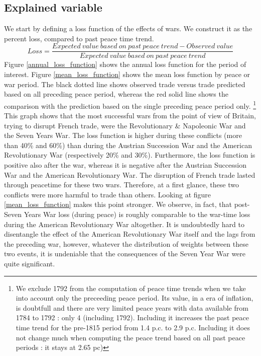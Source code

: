 \documentclass[12pt,a4paper,notitlepage,english]{article}
\begin{document}
\subsection{Explained variable}
We start by defining a loss function of the effects of wars.
We construct it as the percent loss, compared to past peace time trend.
\begin{equation*}
Loss = \frac{Expected \> value \> based \> on \>past \> peace \>trend - Observed \> value}{Expected \> value \> based \> on \>past \> peace \>trend}
\end{equation*}
Figure \ref{annual_loss_function} shows the annual loss function for the period of interest. Figure \ref{mean_loss_function} shows the mean loss function by peace or war period.
The black dotted line shows observed trade versus trade predicted based on all preceding peace period, whereas the red solid line shows the comparison with the prediction based on the single preceding peace period only.
\footnote{We exclude 1792 from the computation of peace time trends when we take into account only the preceeding peace period. Its value, in a era of inflation, is doubtfull and there are very limited peace years with data available from 1784 to 1792 : only 4 (including 1792). Including it increases the past peace time trend for the pre-1815 period from 1.4 p.c. to 2.9 p.c. Including it does not change much when computing the peace trend based on all past peace periods : it stays at 2.65 pc)}
This graph shows that the most successful wars from the point of view of Britain, trying to disrupt French trade, were the Revolutionary \& Napoleonic War and the Seven Years War.
The loss function is higher during these conflicts (more than 40\% and 60\%) than during the Austrian Succession War and the American Revolutionary War (respectively 20\% and 30\%).
Furthermore, the loss function is positive also after the war, whereas it is negative after the Austrian Succession War and the American Revolutionary War. The disruption of French trade lasted through peacetime for these two wars. 
Therefore, at a first glance, these two conflicts were more harmful to trade than others.
Looking at figure \ref{mean_loss_function} makes this point stronger.
We observe, in fact, that post-Seven Years War loss (during peace) is roughly comparable to the war-time loss during the American Revolutionary War altogether.
It is undoubtedly hard to disentangle the effect of the American Revolutionary War itself and the lags from the preceding war, however, whatever the distribution of weights between these two events, it is undeniable that the consequences of the Seven Year War were quite significant.
\end{document}
